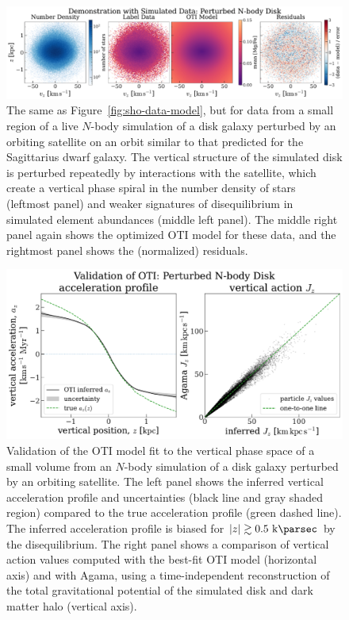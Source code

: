 \begin{figure}[t!]
\begin{center}
\includegraphics[width=\textwidth]{jason-sim-data-model.pdf}
\end{center}
\caption{%
The same as Figure~\ref{fig:sho-data-model}, but for data from a small region of a live
$N$-body simulation of a disk galaxy perturbed by an orbiting satellite on an orbit
similar to that predicted for the Sagittarius dwarf galaxy.
The vertical structure of the simulated disk is perturbed repeatedly by interactions
with the satellite, which create a vertical phase spiral in the number density of stars
(leftmost panel) and weaker signatures of disequilibrium in simulated element abundances
(middle left panel).
The middle right panel again shows the optimized OTI model for these data, and the
rightmost panel shows the (normalized) residuals.
\label{fig:jason-data-model}
}
\end{figure}

\begin{figure}[t!]
\begin{center}
\includegraphics[width=\textwidth]{jason-sim-validation.pdf}
\end{center}
\caption{%
Validation of the OTI model fit to the vertical phase space of a small volume from an
$N$-body simulation of a disk galaxy perturbed by an orbiting satellite.
The left panel shows the inferred vertical acceleration profile and uncertainties (black
line and gray shaded region) compared to the true acceleration profile (green dashed
line).
The inferred acceleration profile is biased for $|z| \gtrsim 0.5~\kpc$ by the
disequilibrium.
The right panel shows a comparison of vertical action values computed with the best-fit
OTI model (horizontal axis) and with Agama, using a time-independent reconstruction of
the total gravitational potential of the simulated disk and dark matter halo (vertical
axis).
\label{fig:jason-validation}
}
\end{figure}

